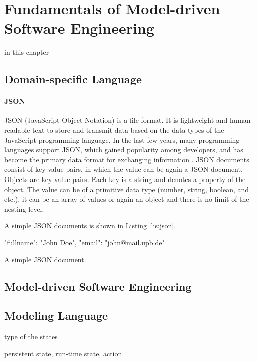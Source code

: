 \chapter{Fundamentals of Model-driven Software Engineering}
\label{ch:fundamentals}

in this chapter

\section{Domain-specific Language}
\subsubsection{JSON}
JSON (JavaScript Object Notation) is a file format. It is lightweight and human-readable text to store and transmit data based on the data types of the JavaScript programming language. In the last few years, many programming languages support JSON, which gained popularity among developers, and has become the primary data format for exchanging information \cite{json-schema}. JSON documents consist of key-value pairs, in which the value can be again a JSON document. Objects are key-value pairs. Each key is a string and denotes a property of the object. The value can be of a primitive data type (number, string, boolean, and etc.), it can be an array of values or again an object and there is no limit of the nesting level. 

A simple JSON documents is shown in Listing \ref{lis:json}.

\FloatBarrier
\begin{code}
\begin{json}
{
    "fullname": "John Doe",
    "email": "john@mail.upb.de"
}
\end{json}
\caption{A simple JSON document.}
\label{lis:json}
\end{code}
\FloatBarrier


\section{Model-driven Software Engineering}
\section{Modeling Language}

type of the states

persistent state, run-time state, action